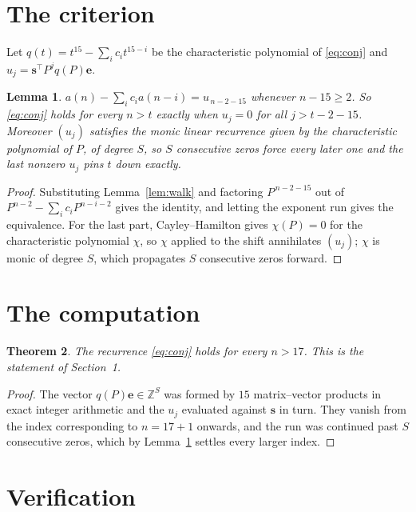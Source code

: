\documentclass[11pt,a4paper]{article}
\theoremstyle{plain}
\newtheorem{theorem}{Theorem}
\newtheorem{lemma}[theorem]{Lemma}
\theoremstyle{definition}
\begin{document}
\section{The criterion}

Let $q(t)=t^{15}-\sum_i c_i t^{15-i}$ be the characteristic polynomial of
\eqref{eq:conj} and $u_j=\mathbf{s}^{\!\top}P^{j}q(P)\mathbf{e}$.

\begin{lemma}\label{lem:crit}
$a(n)-\sum_i c_i a(n-i)=u_{\,n-2-15}$ whenever $n-15\ge2$. So \eqref{eq:conj}
holds for every $n>t$ exactly when $u_j=0$ for all $j>t-2-15$. Moreover $(u_j)$
satisfies the monic linear recurrence given by the characteristic polynomial of $P$, of
degree $S$, so $S$ consecutive zeros force every later one and the last nonzero $u_j$ pins
$t$ down exactly.
\end{lemma}

\begin{proof}
Substituting Lemma~\ref{lem:walk} and factoring $P^{\,n-2-15}$ out of
$P^{n-2}-\sum_i c_i P^{n-i-2}$ gives the identity, and letting the exponent run gives the
equivalence. For the last part, Cayley--Hamilton gives $\chi(P)=0$ for the characteristic
polynomial $\chi$, so $\chi$ applied to the shift annihilates $(u_j)$; $\chi$ is monic of
degree $S$, which propagates $S$ consecutive zeros forward.
\end{proof}

\section{The computation}

\begin{theorem}
The recurrence \eqref{eq:conj} holds for every $n>17$. This is the statement of
Section~1.
\end{theorem}

\begin{proof}
The vector $q(P)\mathbf{e}\in\mathbb{Z}^{S}$ was formed by $15$ matrix--vector
products in exact integer arithmetic and the $u_j$ evaluated against $\mathbf{s}$ in turn.
They vanish from the index corresponding to $n=17+1$ onwards, and the run was continued
past $S$ consecutive zeros, which by Lemma~\ref{lem:crit} settles every larger index.
\end{proof}

\section{Verification}
\end{document}
